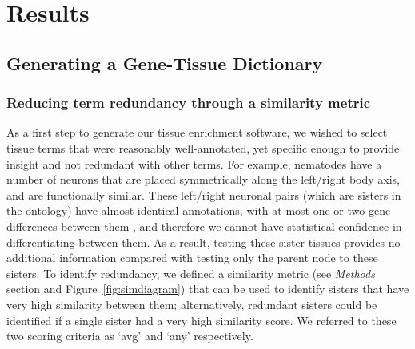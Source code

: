 \documentclass{bmcart}
\begin{document}

\section*{Results}
\subsection*{Generating a Gene-Tissue Dictionary}
\subsubsection*{Reducing term redundancy through a similarity metric}
As a first step to generate our tissue enrichment software, we wished to select tissue terms that were reasonably well-annotated, yet specific enough to provide insight and not redundant with other terms. %
For example, nematodes have a number of neurons that are placed symmetrically along the left/right body axis, and are functionally similar. These left/right neuronal pairs (which are sisters in the ontology) have almost identical annotations, with at most one or two gene differences between them%
, and therefore we cannot have statistical confidence in differentiating between them. As a result, testing these sister tissues provides no additional information compared with testing only the parent node to these sisters. %
To identify redundancy, we defined a similarity metric (see \emph{Methods} section and Figure~\ref{fig:simdiagram}) that can be used to identify sisters that have very high similarity between them; alternatively, redundant sisters could be identified if a single sister had a very high similarity score. We referred to these two scoring criteria as `avg' and `any' respectively.
\end{document}
